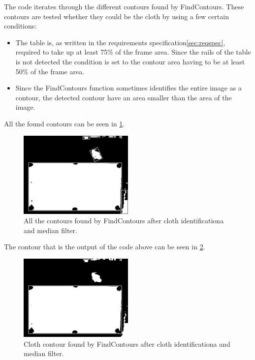 The code iterates through the different contours found by FindContours. These contours are tested whether  they could be the cloth by using a few certain conditions:

\begin{itemize}
\setlength{\itemsep}{0mm}
	\item The table is, as written in the requirements specification\ref{sec:reqspec}, required to take up at least 75\% of the frame area. Since the rails of the table is not detected the condition is set to the contour area having to be at least 50\% of the frame area. 
	\item Since the FindContours function sometimes identifies the entire image as a contour, the detected contour have an area smaller than the area of the image.
\end{itemize}

All the found contours can be seen in \ref{fig:allcontours}.
\begin{figure}[H]
\begin{center}
\leavevmode
\includegraphics[width=0.5\textwidth]{images/allcontours}
\end{center}
\caption{All the contours found by FindContours after cloth identificationa and median filter.}
\label{fig:allcontours}
\end{figure}

The contour that is the output of the code above can be seen in \ref{fig:clothcontour}.
\begin{figure}[H]
\begin{center}
\leavevmode
\includegraphics[width=0.5\textwidth]{images/clothcontour}
\end{center}
\caption{Cloth contour found by FindContours after cloth identificationa and median filter.}
\label{fig:clothcontour}
\end{figure}

